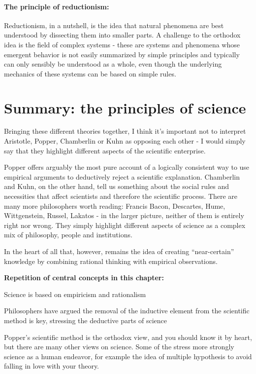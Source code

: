 \documentclass{tufte-book}
\begin{document}
\paragraph{The principle of reductionism:} Reductionism, in a nutshell, is the idea that natural phenomena are best understood by dissecting them into smaller parts. A challenge to the orthodox idea is the field of complex systems - these are systems and phenomena whose emergent behavior is not easily summarized by simple principles and typically can only sensibly be understood as a whole, even though the underlying mechanics of these systems can be based on simple rules.


\section{Summary: the principles of science}

Bringing these different theories together, I think it's important not to interpret Aristotle, Popper, Chamberlin or Kuhn as opposing each other - I would simply say that they highlight different aspects of the scientific enterprise.

Popper offers arguably the most pure account of a logically consistent way to use empirical arguments to deductively reject a scientific explanation. Chamberlin and Kuhn, on the other hand, tell us something about the social rules and necessities that affect scientists and therefore the scientific process. There are many more philosophers worth reading: Francis Bacon, Descartes, Hume, Wittgenstein, Russel, Lakatos - in the larger picture, neither of them is entirely right nor wrong. They simply highlight different aspects of science as a complex mix of philosophy, people and institutions.

In the heart of all that, however, remains the idea of creating ``near-certain'' knowledge by combining rational thinking with empirical observations.

\vspace{1cm}
\begin{mdframed}[backgroundcolor=black!10,rightline=false,leftline=false]

\textbf{Repetition of central concepts in this chapter:}

\begin{itemize*}
  \item Science is based on empiricism and rationalism
  \item Philosophers have argued the removal of the inductive element from the scientific method is key, stressing the deductive parts of science
  \item Popper's scientific method is the orthodox view, and you should know it by heart, but there are many other views on science. Some of the stress more strongly science as a human endeavor, for example the idea of multiple hypothesis to avoid falling in love with your theory.
\end{itemize*}

\end{mdframed}
\end{document}
